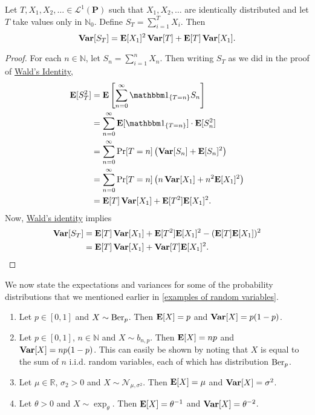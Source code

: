 \begin{theorem}
\label{blackwell girshick randvarsum variance}
    Let $T,X_1,X_2,\ldots\in\mathcal{L}^1(\textbf{P})$ such that $X_1,X_2,\ldots$ are identically distributed and let $T$ take values only in $\mathbb{N}_0$. Define $S_T=\sum_{i=1}^T X_i$. Then
    $$\operatorname{\textbf{Var}}[S_T]=\textbf{E}[X_1]^2\operatorname{\textbf{Var}}[T] + \textbf{E}[T]\operatorname{\textbf{Var}}[X_1].$$
\end{theorem}
\begin{proof}
    For each $n\in\mathbb{N}$, let $S_n=\sum_{i=1}^n X_n$. Then writing $S_T$ as we did in the proof of \hyperref[walds identity randvarsum expec]{Wald's Identity},
    \begin{align*}
        \expec[S_T^2] &= \expec\left[\sum_{n=0}^\infty \indic_{\{T=n\}} S_n\right] \\
        &= \sum_{n=0}^\infty \expec[\indic_{\{T=n\}}]\cdot\expec[S_n^2] \\
        &= \sum_{n=0}^\infty \Pr[T=n]\left(\Var[S_n]+\expec[S_n]^2\right) \\
        &= \sum_{n=0}^\infty \Pr[T=n]\left(n\Var[X_1]+n^2\expec[X_1]^2\right) \\
        &= \expec[T]\Var[X_1] + \expec[T^2]\expec[X_1]^2.
    \end{align*}
    Now, \hyperref[walds identity randvarsum expec]{Wald's identity} implies
    \begin{align*}
        \operatorname{\textbf{Var}}[S_T] &= \textbf{E}[T]\operatorname{\textbf{Var}}[X_1] + \textbf{E}[T^2]\textbf{E}[X_1]^2 - (\textbf{E}[T]\textbf{E}[X_1])^2 \\
        &= \textbf{E}[T]\operatorname{\textbf{Var}}[X_1] + \operatorname{\textbf{Var}}[T]\textbf{E}[X_1]^2.
    \end{align*}
\end{proof}

We now state the expectations and variances for some of the probability distributions that we mentioned earlier in \cref{examples of random variables}.

\begin{enumerate}
    \item Let $p\in[0,1]$ and $X\sim\operatorname{Ber}_p$. Then $\textbf{E}[X]=p$ and $\operatorname{\textbf{Var}}[X]=p(1-p)$.
    
    \item Let $p\in[0,1]$, $n\in\mathbb{N}$ and $X\sim b_{n,p}$. Then $\textbf{E}[X]=np$ and $\operatorname{\textbf{Var}}[X]=np(1-p)$. This can easily be shown by noting that $X$ is equal to the sum of $n$ i.i.d. random variables, each of which has distribution $\operatorname{Ber}_p$.
    
    \item Let $\mu\in\mathbb{R}$, $\sigma_2>0$ and $X\sim\mathcal{N}_{\mu,\sigma^2}$. Then $\textbf{E}[X]=\mu$ and $\operatorname{\textbf{Var}}[X]=\sigma^2$.
    
    \item Let $\theta>0$ and $X\sim\exp_\theta$. Then $\textbf{E}[X]=\theta^{-1}$ and $\operatorname{\textbf{Var}}[X]=\theta^{-2}$.
\end{enumerate}

